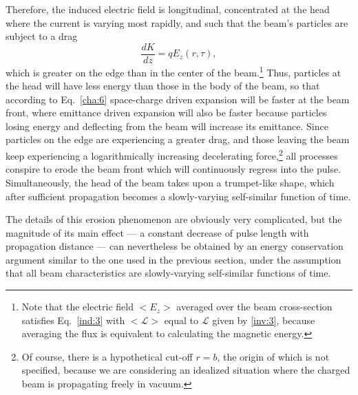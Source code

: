\documentclass [12pt,a4paper,     ]{report} %
\begin{document}
   Therefore, the induced electric field is longitudinal, concentrated at the head where the current is varying most rapidly, and such that the beam's particles are subject to a drag
%
\begin{equation}\label{ind:5} %
       \frac{d K}{d z}  = q E_z (r,\tau),
 \end{equation}
%
which is greater on the edge than in the center of the beam.\footnote{Note that the electric field $<E_z>$ averaged over the beam cross-section satisfies Eq.~\eqref{ind:3} with $<\mathcal{L}>$ equal to $\mathcal{L}$ given by \eqref{inv:3}, because averaging the flux is equivalent to calculating the magnetic energy.}  Thus, particles at the head will have less energy than those in the body of the beam, so that according to Eq.~\eqref{cha:6} space-charge driven expansion will be faster at the beam front, where emittance driven expansion will also be faster because particles losing energy and deflecting from the beam will increase its emittance.  Since particles on the edge are experiencing a greater drag, and those leaving the beam keep experiencing a logarithmically increasing decelerating force,\footnote{Of course, there is a hypothetical cut-off $r=b$, the origin of which is not specified, because we are considering an idealized situation where the charged beam is propagating freely in vacuum.} all processes conspire to erode the beam front which will continuously regress into the pulse.  Simultaneously, the head of the beam takes upon a trumpet-like shape, which after sufficient propagation becomes a  slowly-varying self-similar function of time.

  The details of this erosion phenomenon are obviously very complicated, but the magnitude of its main effect --- a constant decrease of pulse length with propagation distance --- can nevertheless be obtained by an energy conservation argument similar to the one used in the previous section, under the assumption that all beam characteristics are slowly-varying self-similar functions of time.
\end{document}
